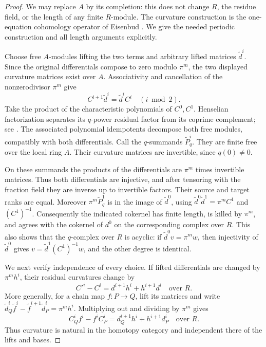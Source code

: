 \begin{proof}
We may replace $A$ by its completion: this does not change $R$,
the residue field, or the length of any finite $R$-module.
The curvature construction is the one-equation cohomology operator
of Eisenbud \cite[Proposition~1.3 and Corollary~1.4, pp.~40--41]
{C-Eisenbud1980}. We give the needed periodic construction and all
length arguments explicitly.

Choose free $A$-modules lifting the two terms and arbitrary lifted
matrices $\widetilde d^i$. Since the original differentials compose
to zero modulo $\pi^m$, the two displayed curvature matrices exist
over $A$. Associativity and cancellation of the nonzerodivisor
$\pi^m$ give
\[
 C^{i+1}\widetilde d^i=\widetilde d^i C^i
 \quad(i\bmod2).
\]
Take the product of the characteristic polynomials of $C^0,C^1$.
Henselian factorization separates its $q$-power residual factor
from its coprime complement; see \cite[Lemma~10.153.3(3),(4),
Tag~04GG]{C-StacksHensel}. The associated polynomial idempotents
decompose both free modules, compatibly with both differentials.
Call the $q$-summands $\widetilde P_q^i$. They are finite free over
the local ring $A$. Their curvature matrices are invertible,
since $q(0)\ne0$.

On these summands the products of the differentials are $\pi^m$
times invertible matrices. Thus both differentials are injective,
and after tensoring with the fraction field they are inverse up
to invertible factors. Their source and target ranks are equal.
Moreover $\pi^m\widetilde P_q^1$ is in the image of
$\widetilde d^0$, using
$\widetilde d^0\widetilde d^1=\pi^mC^1$ and $(C^1)^{-1}$.
Consequently the indicated cokernel has finite length, is killed
by $\pi^m$, and agrees with the cokernel of $d^0$ on the corresponding
complex over $R$. This also shows that the $q$-complex over $R$ is
acyclic: if $\widetilde d^0v=\pi^mw$, then injectivity of
$\widetilde d^0$ gives
$v=\widetilde d^1(C^1)^{-1}w$, and the other degree is identical.

We next verify independence of every choice. If lifted
differentials are changed by $\pi^mh^i$, their residual curvatures
change by
\[
 C'^i-C^i=d^{i+1}h^i+h^{i+1}d^i
          \quad\text{over }R.
\]
More generally, for a chain map $f:P\to Q$, lift its matrices and
write
$\widetilde d_Q^i\widetilde f^i-
 \widetilde f^{i+1}\widetilde d_P^i=\pi^mh^i$.
Multiplying out and dividing by $\pi^m$ gives
\[
 C_Q^if^i-f^iC_P^i=d_Q^{i+1}h^i+h^{i+1}d_P^i
          \quad\text{over }R.                         \tag{C.1.28}
\]
Thus curvature is natural in the homotopy category and independent
there of the lifts and bases.


\end{proof}
